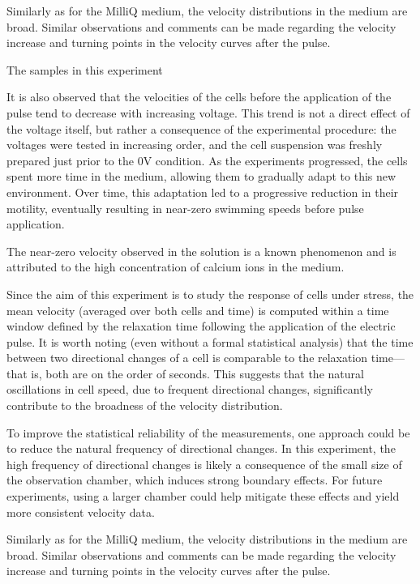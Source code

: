 Similarly as for the MilliQ medium, the velocity distributions in the  medium are broad. Similar observations and comments can be made regarding the velocity increase and turning points in the velocity curves after the pulse.

The samples in this experiment 

It is also observed that the velocities of the cells before the application of the pulse tend to decrease with increasing voltage. This trend is not a direct effect of the voltage itself, but rather a consequence of the experimental procedure: the voltages were tested in increasing order, and the cell suspension was freshly prepared just prior to the 0V condition. As the experiments progressed, the cells spent more time in the  medium, allowing them to gradually adapt to this new environment. Over time, this adaptation led to a progressive reduction in their motility, eventually resulting in near-zero swimming speeds before pulse application.

The near-zero velocity observed in the  solution is a known phenomenon \cite{cell_stop} and is attributed to the high concentration of calcium ions in the medium. 



\vspace{1em}
Since the aim of this experiment is to study the response of cells under stress, the mean velocity (averaged over both cells and time) is computed within a time window defined by the relaxation time following the application of the electric pulse. It is worth noting (even without a formal statistical analysis) that the time between two directional changes of a cell is comparable to the relaxation time—that is, both are on the order of seconds. This suggests that the natural oscillations in cell speed, due to frequent directional changes, significantly contribute to the broadness of the velocity distribution.

To improve the statistical reliability of the measurements, one approach could be to reduce the natural frequency of directional changes. In this experiment, the high frequency of directional changes is likely a consequence of the small size of the observation chamber, which induces strong boundary effects. For future experiments, using a larger chamber could help mitigate these effects and yield more consistent velocity data.


Similarly as for the MilliQ medium, the velocity distributions in the  medium are broad. Similar observations and comments can be made regarding the velocity increase and turning points in the velocity curves after the pulse.

